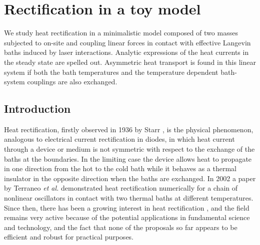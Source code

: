 
\chapter{Rectification in a toy model}
\label{ChapterToyModel}
%
We study heat rectification in a minimalistic model composed of two masses subjected to on-site and coupling
linear forces in contact with effective Langevin baths induced by laser interactions.  Analytic expressions of the heat currents in the steady state are spelled out.  Asymmetric heat transport is found in this linear system if both the bath temperatures and the temperature dependent bath-system couplings
are also exchanged.
%
\newpage
%
\section{Introduction \label{sec:Introduction}}
%
Heat rectification, firstly observed in 1936 by Starr \cite{Starr1936}, is the physical phenomenon, analogous to electrical current rectification in diodes, in which heat current through a device or medium is not symmetric with respect to the exchange of the baths at the boundaries. In the limiting case the device allows heat to propagate in one direction from the hot to the cold bath while it behaves as a thermal insulator in the opposite direction when the baths are exchanged.  In 2002 a paper by Terraneo \textit{et al.} \cite{Terraneo2002} demonstrated heat rectification numerically for a chain of nonlinear oscillators in contact with two thermal baths at different temperatures. Since then, there has been a growing interest in heat rectification  \cite{Pereira2019,Roberts2011,Li2012,Ye2017,Wang2008,Wang2007,Li2006,Joulain2016,Chang2006,Kobayashi2009,Leitner2013,Elzouka2017,Pons2017,Alexander2020}, and the field remains very active because of the potential applications in fundamental science and technology, and the
fact that none of the proposals so far appears to be efficient and robust for
practical purposes.

